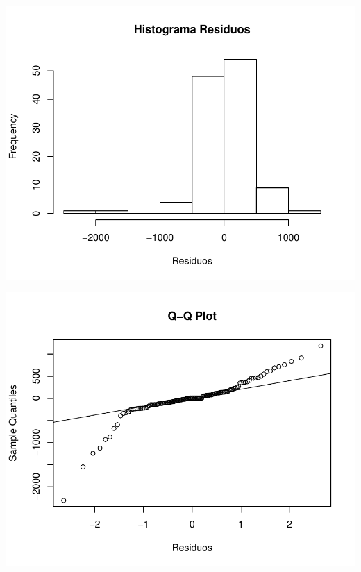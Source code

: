 \documentclass[11pt,a4paper,oneside]{article}\usepackage[]{graphicx}\usepackage[]{color}
\makeatletter
\def\maxwidth{ %
  \ifdim\Gin@nat@width>\linewidth
    \linewidth
  \else
    \Gin@nat@width
  \fi
}
\newenvironment{knitrout}{}{} %
\makeatother
\begin{document}
\begin{knitrout}
{\centering \includegraphics[width=\maxwidth]{figure/unnamed-chunk-16-5} 

}




{\centering \includegraphics[width=\maxwidth]{figure/unnamed-chunk-16-6} 

}





\end{knitrout}
\end{document}
